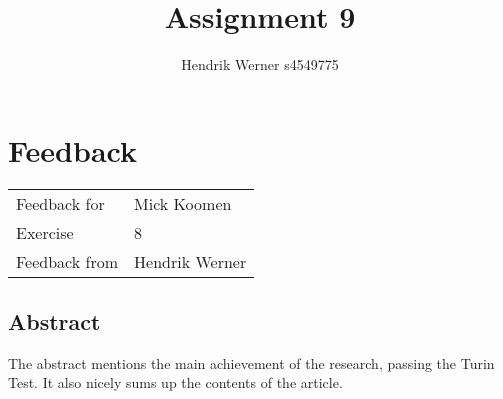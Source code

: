 \documentclass[12pt, a4paper]{article}
\title{Assignment 9}
\author{Hendrik Werner s4549775}
\begin{document}
\maketitle

\clearpage
\section{Feedback}

\begin{tabular}{ll}
	Feedback for & Mick Koomen\\
	Exercise & 8\\
	Feedback from & Hendrik Werner\\
\end{tabular}

\subsection{Abstract}
The abstract mentions the main achievement of the research, passing the Turin Test. It also nicely sums up the contents of the article.
\end{document}
